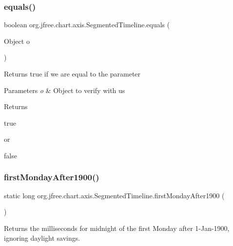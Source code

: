 \subsubsection{\texorpdfstring{equals()}{equals()}}
{\footnotesize\ttfamily boolean org.\+jfree.\+chart.\+axis.\+Segmented\+Timeline.\+equals (\begin{DoxyParamCaption}\item[{Object}]{o }\end{DoxyParamCaption})}

Returns true if we are equal to the parameter


\begin{DoxyParams}{Parameters}
{\em o} & Object to verify with us\\
\hline
\end{DoxyParams}
\begin{DoxyReturn}{Returns}

\begin{DoxyCode}
\textcolor{keyword}{true} 
\end{DoxyCode}
 or
\begin{DoxyCode}
\textcolor{keyword}{false} 
\end{DoxyCode}
 
\end{DoxyReturn}
\mbox{\label{classorg_1_1jfree_1_1chart_1_1axis_1_1_segmented_timeline_ab3383e4a942db7477039a9d0cc586555}} 
\subsubsection{\texorpdfstring{first\+Monday\+After1900()}{firstMondayAfter1900()}}
{\footnotesize\ttfamily static long org.\+jfree.\+chart.\+axis.\+Segmented\+Timeline.\+first\+Monday\+After1900 (\begin{DoxyParamCaption}{ }\end{DoxyParamCaption})\hspace{0.3cm}{\ttfamily [static]}}

Returns the milliseconds for midnight of the first Monday after 1-\/\+Jan-\/1900, ignoring daylight savings.

